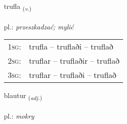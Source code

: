 \documentclass[frontgrid, backgrid]{flacards}\usepackage[]{graphicx}\usepackage[]{xcolor}
\begin{document}
\renewcommand{\flhead}{\vskip5pt \fboxsep=0pt {\small\bfseries\footnotesize Sagnorð | czasownik}}
\renewcommand{\fcfoot}{\vskip5pt \fboxsep=0pt \hspace{2pt}{\small\bfseries\footnotesize 3K}}

\renewcommand{\blhead}{\vskip5pt {\small\bfseries\footnotesize Sagnorð | czasownik }}
\renewcommand{\bcfoot}{\vskip5pt \hspace{2pt}{\small\bfseries\footnotesize 3K}}


{trufla \small{\textsubscript{(\textit{v.})}} \\[1ex] %
\textphonetic{[tʰrʏpla]} \\
pl.: \emph{przeszkadzać; mylić} \\  [2ex]
\renewcommand*{\arraystretch}{0.8}
\begin{tabular}{p{1cm}l}
\textsc{1sg}: & trufla -- truflaði -- truflað \\ 
\textsc{2sg}: & truflar -- truflaðir -- truflað \\ 
\textsc{3sg}: & truflar -- truflaði -- truflað \\ 
\end{tabular}
}

\renewcommand{\flhead}{\vskip5pt \fboxsep=0pt {\small\bfseries\footnotesize Lýsingarorð | przymiotnik}}
\renewcommand{\fcfoot}{\vskip5pt \fboxsep=0pt \hspace{2pt}{\small\bfseries\footnotesize 3K}}

\renewcommand{\blhead}{\vskip5pt {\small\bfseries\footnotesize Lýsingarorð | przymiotnik }}
\renewcommand{\bcfoot}{\vskip5pt \hspace{2pt}{\small\bfseries\footnotesize 3K}}


{blautur \small{\textsubscript{(\textit{adj.})}} \\[1ex] %
\textphonetic{[plœiːtʏr]} \\
pl.: \emph{mokry} \\  [2ex]
\renewcommand*{\arraystretch}{0.8}
}
\end{document}
